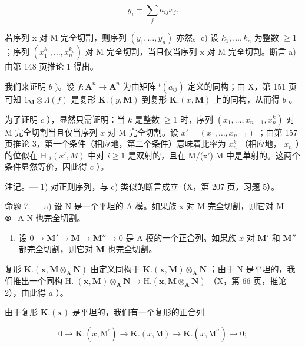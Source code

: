 \[
y _ {i} = \sum_ {j} a _ {i j} x _ {j}.
\]

若序列 x 对 M 完全切割，则序列 \((y_{1}, \ldots, y_{n})\) 亦然。c) 设 \(k_{1}, \ldots, k_{n}\) 为整数 \(\geqslant 1\) ；序列 \((x_{1}^{k_{1}}, \ldots, x_{n}^{k_{n}})\) 对 M 完全切割，当且仅当序列 x 对 M 完全切割。断言 a) 由第 148 页推论 1 得出。

我们来证明 \(b\) )。设 \(f: \mathbf{A}^n \to \mathbf{A}^n\) 为由矩阵 \(^t(a_{ij})\) 定义的同构；由 X，第 151 页可知 \(1_{\mathbf{M}} \otimes \Lambda(f)\) 是复形 \(\mathbf{K}.(y, \mathbf{M})\) 到复形 \(\mathbf{K}.(x, \mathbf{M})\) 上的同构，从而得 \(b\) 。

为了证明 \(c\) ），显然只需证明：当 \(k\) 是整数 \(\geqslant 1\) 时，序列 \((x_{1}, \ldots, x_{n-1}, x_{n}^{k})\) 对 M 完全切割当且仅当序列 \(x\) 对 M 完全切割。设 \(x' = (x_{1}, \ldots, x_{n-1})\) ；由第 157 页推论 3，第一个条件（相应地，第二个条件）意味着比率为 \(x_{n}^{k}\) （相应地， \(x_{n}\) ）的位似在 H \(_{i}(x', M)\) 中对 \(i \geqslant 1\) 是双射的，且在 M/(x') M 中是单射的。这两个条件显然等价，因此得 \(c\) ）。

注记。--- 1) 对正则序列，与 c) 类似的断言成立（X，第 207 页，习题 5）。

命题 7. --- a) 设 N 是一个平坦的 A-模。如果族 x 对 M 完全切割，则它对 M ⊗\_A N 也完全切割。

\begin{enumerate}
\def\labelenumi{\alph{enumi})}
\setcounter{enumi}{1}
\tightlist
\item
  设 \(0 \to \mathbf{M}' \to \mathbf{M} \to \mathbf{M}'' \to 0\) 是 A-模的一个正合列。如果族 \(x\) 对 \(\mathbf{M}'\) 和 \(\mathbf{M}''\) 都完全切割，则它对 \(\mathbf{M}\) 也完全切割。
\end{enumerate}

复形 \(\mathbf{K}.\left(\mathbf{x},\mathbf{M}\otimes_{\mathbf{A}}\mathbf{N}\right)\) 由定义同构于 \(\mathbf{K}.\left(\mathbf{x},\mathbf{M}\right)\otimes_{\mathbf{A}}\mathbf{N}\) ；由于 N 是平坦的，我们推出一个同构 H. \((\mathbf{x},\mathbf{M})\otimes_{\mathbf{A}}\mathbf{N}\to\mathrm{H}.\left(\mathbf{x},\mathbf{M}\otimes_{\mathbf{A}}\mathbf{N}\right)\) （X，第 66 页，推论 2），由此得 \(a\) ）。

由于复形 \(\mathbf{K}.\left(\mathbf{x}\right)\) 是平坦的，我们有一个复形的正合列

\[
0 \rightarrow \mathbf {K}. (x, \mathrm{M} ^ {\prime}) \rightarrow \mathbf {K}. (x, \mathrm{M}) \rightarrow \mathbf {K}. (x, \mathrm{M} ^ {\prime \prime}) \rightarrow 0;
\]


